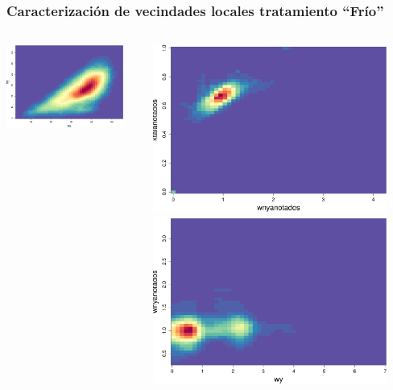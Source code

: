 \documentclass[serif,9pt, t]{beamer}
\begin{document}
\begin{frame}\frametitle{Caracterización de vecindades locales tratamiento ``Frío''} 
\begin{columns}[T]
    \centering
    \includegraphics[width=0.90\textwidth]{nx_vs_ny.pdf}
    
    \centering
    \includegraphics[width=0.90\textwidth]{lktaanotados_vs_wnyanotados.pdf}
    \centering
    \includegraphics[width=0.90\textwidth]{wy_vs_wynanotados.pdf}
    

\end{columns}
\end{frame}
\end{document}

